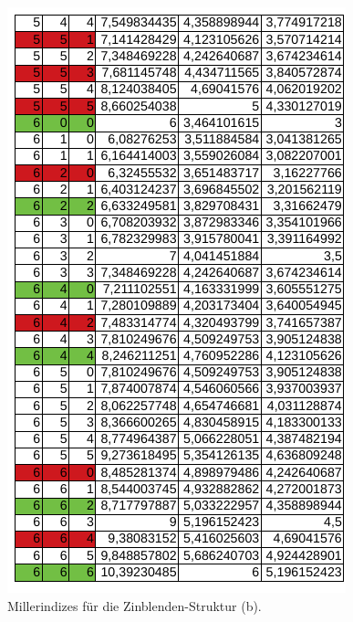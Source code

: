 \begin{figure}
  \centering
  \includegraphics{ressources/Zinkblende2.png}
  \caption{Millerindizes für die Zinblenden-Struktur (b).}
  \label{fig:Anhang6}
\end{figure}